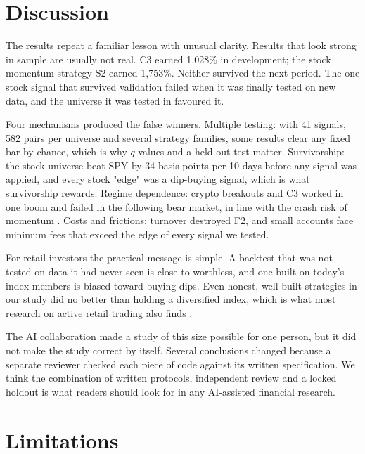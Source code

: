 \documentclass[11pt]{article}
\begin{document}
\section{Discussion}

The results repeat a familiar lesson with unusual clarity. Results that look strong in sample are
usually not real. C3 earned 1,028\% in development; the stock momentum strategy S2 earned 1,753\%.
Neither survived the next period. The one stock signal that survived validation failed when it was
finally tested on new data, and the universe it was tested in favoured it.

Four mechanisms produced the false winners. Multiple testing: with 41 signals, 582 pairs per
universe and several strategy families, some results clear any fixed bar by chance, which is why
$q$-values and a held-out test matter. Survivorship: the stock universe beat SPY by 34 basis points
per 10 days before any signal was applied, and every stock "edge" was a dip-buying signal, which
is what survivorship rewards. Regime dependence: crypto breakouts and C3 worked in one boom and
failed in the following bear market, in line with the crash risk of momentum
\citep{daniel2016momentum}. Costs and frictions: turnover destroyed F2, and small accounts face
minimum fees that exceed the edge of every signal we tested.

For retail investors the practical message is simple. A backtest that was not tested on data it had
never seen is close to worthless, and one built on today's index members is biased toward buying
dips. Even honest, well-built strategies in our study did no better than holding a diversified
index, which is what most research on active retail trading also finds
\citep{barber2000trading,barber2014speculator,chague2019daytrading}.

The AI collaboration made a study of this size possible for one person, but it did not make the
study correct by itself. Several conclusions changed because a separate reviewer checked each piece
of code against its written specification. We think the combination of written protocols,
independent review and a locked holdout is what readers should look for in any AI-assisted
financial research.

\section{Limitations}
\end{document}
